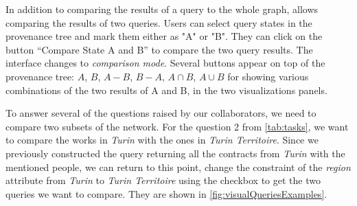 In addition to comparing the results of a query to the whole graph, \name allows comparing the results of two queries.
Users can select query states in the provenance tree and mark them either as "A" or "B". They can click on the button ``Compare State A and B'' to compare the two query results. The interface changes to \textit{comparison mode}. Several buttons appear on top of the provenance tree: $A$, $B$, $A-B$, $B-A$, $A \cap B$, $A \cup B$ for showing various combinations of the two results of A and B, in the two visualizations panels.


To answer several of the questions raised by our collaborators, we need to compare two subsets of the network.
For the question 2 from \autoref{tab:tasks}, we want to compare the works in \textit{Turin} with the ones in \textit{Turin Territoire}. Since we previously constructed the query returning all the contracts from \textit{Turin} with the mentioned people, we can
return to this point, change the constraint of the \textit{region} attribute from \textit{Turin} to \textit{Turin Territoire} using the checkbox to get the two queries we want to compare. They are shown in \autoref{fig:visualQueriesExamples}.




